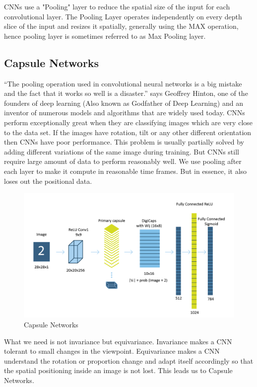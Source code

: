 \documentclass{vldb}
\begin{document}
CNNs use a "Pooling" layer to reduce the spatial size of the input for each convolutional layer. The Pooling Layer operates independently on every depth slice of the input and resizes it spatially, generally using the MAX operation, hence pooling layer is sometimes referred to as Max Pooling layer.

\subsection{Capsule Networks} %
\label{sec:capsule_networks}
“The pooling operation used in convolutional neural networks is a big mistake and the fact that it works so well is a disaster.” says Geoffrey Hinton, one of the founders of deep learning (Also known as Godfather of Deep Learning) and an inventor of numerous models and algorithms that are widely used today. CNNs perform exceptionally great when they are classifying images which are very close to the data set. If the images have rotation, tilt or any other different orientation then CNNs have poor performance. This problem is usually partially solved by adding different variations of the same image during training. But CNNs still require large amount of data to perform reasonably well. We use pooling after each layer to make it compute in reasonable time frames. But in essence, it also loses out the positional data.\par\bigskip
\begin{figure}[H]
\centering\includegraphics[width=\linewidth]{../Final_Report/images/caps.png}
\caption{Capsule Networks}
\label{fig:caps}
\end{figure}
What we need is not invariance but equivariance. Invariance makes a CNN tolerant to small changes in the viewpoint. Equivariance makes a CNN understand the rotation or proportion change and adapt itself accordingly so that the spatial positioning inside an image is not lost. This leads us to Capsule Networks.\par\bigskip
\end{document}
